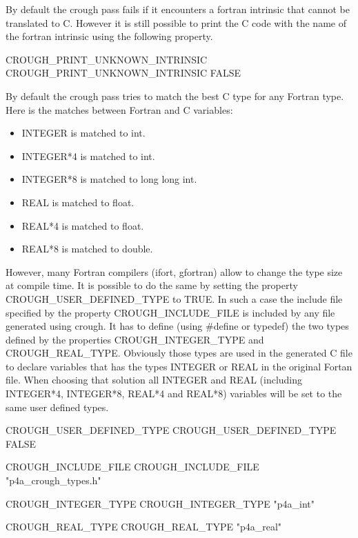 \documentclass[a4paper]{report}
\begin{document}
By default the crough pass fails if it encounters a fortran intrinsic that
cannot be translated to C. However it is still possible to print the C code
with the name of the fortran intrinsic using the following property.
\begin{PipsProp}{CROUGH_PRINT_UNKNOWN_INTRINSIC}
CROUGH_PRINT_UNKNOWN_INTRINSIC FALSE
\end{PipsProp}

By default the crough pass tries to match the best C type for any Fortran
type. Here is the matches between Fortran and C variables:
\begin{itemize}
\item INTEGER is matched to int.
\item INTEGER*4 is matched to int.
\item INTEGER*8 is matched to long long int.
\item REAL is matched to float.
\item REAL*4 is matched to float.
\item REAL*8 is matched to double.
\end{itemize}
However, many Fortran compilers (ifort, gfortran) allow to change
the type size at compile time. It is possible to do the same by setting the
property CROUGH\_USER\_DEFINED\_TYPE to TRUE. In such a case the include file
specified by the property CROUGH\_INCLUDE\_FILE is included by any file
generated using crough. It has to define (using \#define or
typedef) the two types defined by the properties CROUGH\_INTEGER\_TYPE and
CROUGH\_REAL\_TYPE. Obviously those types are used in the generated C file to
declare variables that has the types INTEGER or REAL in the original Fortan
file. When choosing that solution all INTEGER and REAL (including INTEGER*4,
INTEGER*8, REAL*4 and REAL*8) variables will be set
to the same user defined types.

\begin{PipsProp}{CROUGH_USER_DEFINED_TYPE}
CROUGH_USER_DEFINED_TYPE FALSE
\end{PipsProp}

\begin{PipsProp}{CROUGH_INCLUDE_FILE}
CROUGH_INCLUDE_FILE "p4a_crough_types.h"
\end{PipsProp}

\begin{PipsProp}{CROUGH_INTEGER_TYPE}
CROUGH_INTEGER_TYPE "p4a_int"
\end{PipsProp}

\begin{PipsProp}{CROUGH_REAL_TYPE}
CROUGH_REAL_TYPE "p4a_real"
\end{PipsProp}
\end{document}
